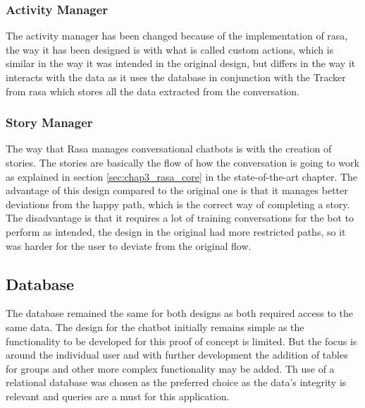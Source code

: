 \subsubsection{Activity Manager}\label{sec:chap4_fin_act}

The activity manager has been changed because of the implementation of rasa, the way it has been designed is with what is called custom actions, which is similar in the way it was intended in the original design, but differs in the way it interacts with the data as it uses the database in conjunction with the Tracker from rasa which stores all the data extracted from the conversation.

\subsubsection{Story Manager}\label{sec:chap4_fin_stor}

The way that Rasa manages conversational chatbots is with the creation of stories. The stories are basically the flow of how the conversation is going to work as explained in section \ref{sec:chap3_rasa_core} in the state-of-the-art chapter. The advantage of this design compared to the original one is that it manages better deviations from the happy path, which is the correct way of completing a story. The disadvantage is that it requires a lot of training conversations for the bot to perform as intended, the design in the original had more restricted paths, so it was harder for the user to deviate from the original flow.

\subsection{Database}\label{sec:chap4_database}

The database remained the same for both designs as both required access to the same data. The design for the chatbot initially remains simple as the functionality to be developed for this proof of concept is limited. But the focus is around the individual user and with further development the addition of tables for groups and other more complex functionality may be added. Th use of a relational database was chosen as the preferred choice as the data’s integrity is relevant and queries are a must for this application.

